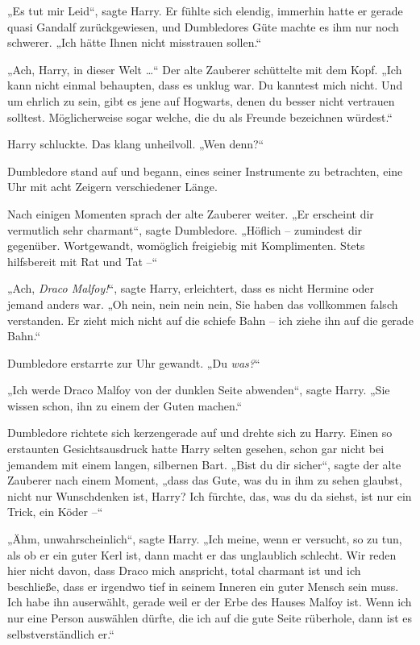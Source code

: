 {„Es tut mir Leid“, sagte Harry. Er fühlte sich elendig, immerhin hatte er gerade quasi Gandalf zurückgewiesen, und Dumbledores Güte machte es ihm nur noch schwerer. „Ich hätte Ihnen nicht misstrauen sollen.“

„Ach, Harry, in dieser Welt …“ Der alte Zauberer schüttelte mit dem Kopf. „Ich kann nicht einmal behaupten, dass es unklug war. Du kanntest mich nicht. Und um ehrlich zu sein, gibt es jene auf Hogwarts, denen du besser nicht vertrauen solltest. Möglicherweise sogar welche, die du als Freunde bezeichnen würdest.“

Harry schluckte. Das klang unheilvoll. „Wen denn?“

Dumbledore stand auf und begann, eines seiner Instrumente zu betrachten, eine Uhr mit acht Zeigern verschiedener Länge.

Nach einigen Momenten sprach der alte Zauberer weiter. „Er erscheint dir vermutlich sehr charmant“, sagte Dumbledore. „Höflich -- zumindest dir gegenüber. Wortgewandt, womöglich freigiebig mit Komplimenten. Stets hilfsbereit mit Rat und Tat --“

„Ach, \emph{Draco Malfoy!}“, sagte Harry, erleichtert, dass es nicht Hermine oder jemand anders war. „Oh nein, nein nein nein, Sie haben das vollkommen falsch verstanden. Er zieht mich nicht auf die schiefe Bahn -- ich ziehe ihn auf die gerade Bahn.“

Dumbledore erstarrte zur Uhr gewandt. „Du \emph{was?}“

„Ich werde Draco Malfoy von der dunklen Seite abwenden“, sagte Harry. „Sie wissen schon, ihn zu einem der Guten machen.“

Dumbledore richtete sich kerzengerade auf und drehte sich zu Harry. Einen so erstaunten Gesichtsausdruck hatte Harry selten gesehen, schon gar nicht bei jemandem mit einem langen, silbernen Bart. „Bist du dir sicher“, sagte der alte Zauberer nach einem Moment, „dass das Gute, was du in ihm zu sehen glaubst, nicht nur Wunschdenken ist, Harry? Ich fürchte, das, was du da siehst, ist nur ein Trick, ein Köder --“

„Ähm, unwahrscheinlich“, sagte Harry. „Ich meine, wenn er versucht, so zu tun, als ob er ein guter Kerl ist, dann macht er das unglaublich schlecht. Wir reden hier nicht davon, dass Draco mich anspricht, total charmant ist und ich beschließe, dass er irgendwo tief in seinem Inneren ein guter Mensch sein muss. Ich habe ihn auserwählt, gerade weil er der Erbe des Hauses Malfoy ist. Wenn ich nur eine Person auswählen dürfte, die ich auf die gute Seite rüberhole, dann ist es selbstverständlich er.“

}
